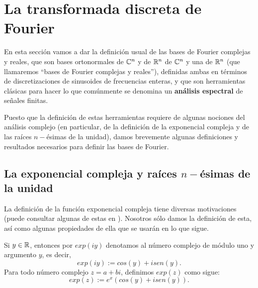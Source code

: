 \section{La transformada discreta de Fourier}

En esta sección vamos a dar la definición usual de 
las bases de Fourier complejas y reales, que son
bases ortonormales de $\mathbb{C}^{n}$ y de $\mathbb{R}^{n}$ 
de $\mathbb{C}^{n}$
y una de $\mathbb{R}^{n}$ (que llamaremos
``bases de Fourier complejas y reales''),
definidas ambas en términos de discretizaciones de
sinusoides de frecuencias enteras, y que son herramientas
clásicas para hacer lo que comúnmente se denomina
un \textbf{análisis espectral} de señales finitas.

Puesto que la definición de estas herramientas requiere
de algunas nociones del análisis complejo (en particular, de la
definición de la exponencial compleja y de las raíces $n-$ésimas
de la unidad), damos brevemente algunas definiciones y resultados
necesarios para definir las bases de Fourier.


\subsection{La exponencial compleja y raíces $n-$ésimas de la unidad}


La definición de la función exponencial compleja 
tiene diversas motivaciones
(puede consultar algunas de estas en 
\cite{marsden}). Nosotros sólo
damos la definición de esta, así como algunas propiedades
de ella que se usarán en lo que sigue.

\begin{defi}
\label{def: exponencial compleja}
Si $y \in \mathbb{R}$, entonces por $exp(iy)$ denotamos al número
complejo de módulo uno y argumento $y$, es decir,
\begin{equation}
\label{eq: exponencial 1}
exp(iy) := cos(y) + i sen(y).
\end{equation}
Para todo número complejo $z = a+bi$, definimos 
$exp(z)$ como sigue:
\begin{equation}
\label{eq: exponencial 2}
exp(z) := e^{x}(cos(y) + i sen(y)).
\end{equation}
\end{defi}

